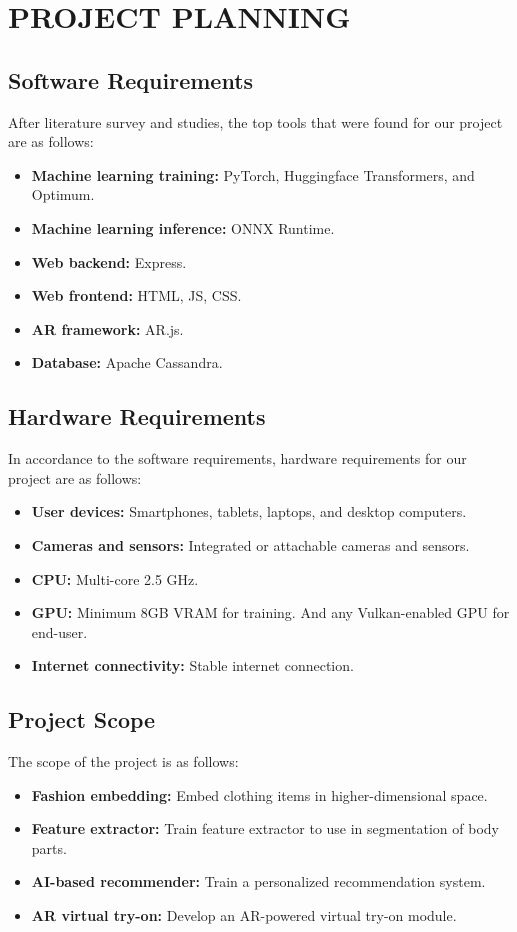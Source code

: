 \chapter{PROJECT PLANNING}

\section{Software Requirements}
	After literature survey and studies, the top tools that were found for our project are as follows:

	\begin{itemize}
		\item \textbf{Machine learning training:} PyTorch, Huggingface Transformers, and Optimum.
		\item \textbf{Machine learning inference:} ONNX Runtime.
		\item \textbf{Web backend:} Express.
		\item \textbf{Web frontend:} HTML, JS, CSS.
		\item \textbf{AR framework:} AR.js.
		\item \textbf{Database:} Apache Cassandra.
	\end{itemize}

\section{Hardware Requirements}
	In accordance to the software requirements, hardware requirements for our project are as follows:

	\begin{itemize}
		\item \textbf{User devices:} Smartphones, tablets, laptops, and desktop computers.
		\item \textbf{Cameras and sensors:} Integrated or attachable cameras and sensors.
		\item \textbf{CPU:} Multi-core 2.5 GHz.
		\item \textbf{GPU:} Minimum 8GB VRAM for training. And any Vulkan-enabled GPU for end-user.
		\item \textbf{Internet connectivity:} Stable internet connection.
	\end{itemize}

\section{Project Scope}
	The scope of the project is as follows:
	
	\begin{itemize}
		\item \textbf{Fashion embedding:} Embed clothing items in higher-dimensional space.
		\item \textbf{Feature extractor:} Train feature extractor to use in segmentation of body parts.
		\item \textbf{AI-based recommender:} Train a personalized recommendation system.
		\item \textbf{AR virtual try-on:} Develop an AR-powered virtual try-on module.
	\end{itemize}

